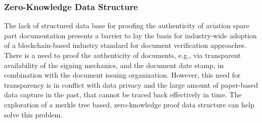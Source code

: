 \subsubsection{Zero-Knowledge Data Structure}
The lack of structured data base for proofing the authenticity of aviation spare part documentation presents a barrier to lay the basis for industry-wide adoption of a blockchain-based industry standard for document verification approaches. There is a need to proof the authenticity of documents, e.g., via transparent availability of the signing mechanics, and the document date stamp, in combination with the document issuing organization. However, this need for transparency is in conflict with data privacy and the large amount of paper-based data capture in the past, that cannot be traced back effectively in time. The exploration of a merkle tree based, zero-knowledge proof data structure can help solve this problem.
